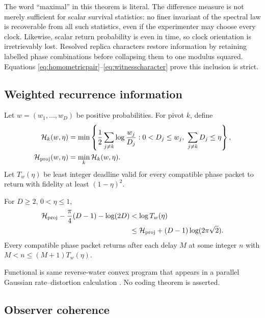 The word ``maximal'' in this theorem is literal.  The difference measure is
not merely sufficient for scalar survival statistics: no finer invariant of
the spectral law is recoverable from all such statistics, even if the
experimenter may choose every clock.  Likewise, scalar return probability is
even in time, so clock orientation is irretrievably lost.  Resolved replica
characters restore information by retaining labelled phase combinations
before collapsing them to one modulus squared.  Equations
\eqref{eq:homometricpair}--\eqref{eq:witnesscharacter} prove this inclusion is
strict.

\subsection{Weighted recurrence information}

Let $w=(w_1,\ldots,w_D)$ be positive probabilities.  For pivot $k$, define
\begin{align}
 \mathcal H_k(w,\eta)&=\min\left\{\frac12\sum_{j\ne k}\log\frac{w_j}{D_j}:
 0<D_j\le w_j,\ \sum_{j\ne k}D_j\le\eta\right\},\\
 \mathcal H_{\rm proj}(w,\eta)&=\min_k\mathcal H_k(w,\eta). \label{eq:water-new}
\end{align}
Let $T_w(\eta)$ be least integer deadline valid for every compatible phase
packet to return with fidelity at least $(1-\eta)^2$.

\begin{theorem}
\label{thm:water}
For $D\ge2$, $0<\eta\le1$,
\begin{align}
 \mathcal H_{\rm proj}-\frac\pi4(D-1)-\log(2D)
 &<\log T_w(\eta)                                      \label{eq:deadlinelower-new}\\
 &\le\mathcal H_{\rm proj}+(D-1)\log(2\pi\sqrt2).        \label{eq:deadlinelaw-new}
\end{align}
Every compatible phase packet returns after each delay $M$ at some integer
$n$ with $M<n\le(M+1)T_w(\eta)$.
\end{theorem}

Functional is same reverse-water convex program that appears in a parallel
Gaussian rate--distortion calculation
\cite{CoverThomas2006,GrayNeuhoff1998}.  No coding theorem is asserted.

\subsection{Observer coherence}

